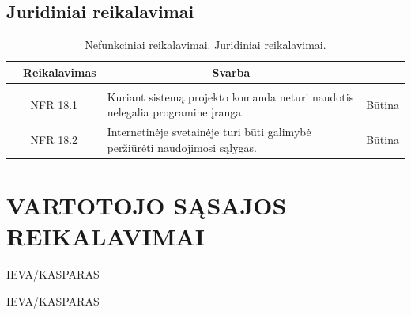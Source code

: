 \documentclass{VUMIFPSkursinis}
\begin{document}
\subsection{Juridiniai reikalavimai}
\begin{table}[H]
	\caption{Nefunkciniai reikalavimai. Juridiniai reikalavimai.}
	\begin{tabular}{|p{1cm}|p{1cm}|p{}|p{}|}
	\hline 
\rowcolor{gray!50}
		\multicolumn{2}{|c|}{{\bfseries Kodas}}&
		\multicolumn{1}{c|}{{\bfseries Reikalavimas}}&
		\multicolumn{1}{c|}{{\bfseries Svarba}}\\
\hline
\rowcolor{lightgray}
\multicolumn{4}{|c|}{Juridiniai reikalavimai}\\		

\hline
	\multicolumn{2}{|c|}{NFR 18.1}&
	{Kuriant sistemą projekto komanda neturi naudotis nelegalia
programine įranga.
}&		
	\multicolumn{1}{c|}{Būtina}\\
	
\hline
	\multicolumn{2}{|c|}{NFR 18.2}&
	{Internetinėje svetainėje turi būti galimybė peržiūrėti naudojimosi sąlygas.
}&		
	\multicolumn{1}{c|}{Būtina}\\				
	\hline
	\end{tabular}		
	\end{table}
\newpage

\section{VARTOTOJO SĄSAJOS REIKALAVIMAI}
IEVA/KASPARAS
\newpage

IEVA/KASPARAS
\newpage
\end{document}
